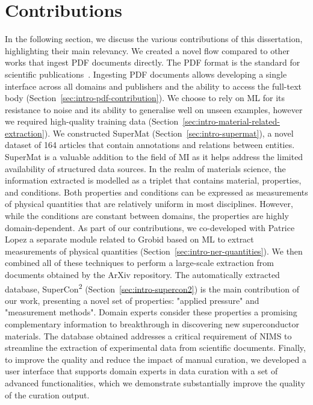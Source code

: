 \section{Contributions}
\label{sec-intro-contributions}
In the following section, we discuss the various contributions of this dissertation, highlighting their main relevancy. 
We created a novel flow compared to other works that ingest PDF documents directly. 
The PDF format is the standard for scientific publications~\cite{johnson2018pdfStatistics}. 
Ingesting PDF documents allows developing a single interface across all domains and publishers and the ability to access the full-text body (Section~\ref{sec:intro-pdf-contribution}). 
We choose to rely on ML for its resistance to noise and its ability to generalise well on unseen examples, however we required high-quality training data (Section~\ref{sec:intro-material-related-extraction}). 
We constructed SuperMat (Section~\ref{sec:intro-supermat}), a novel dataset of 164 articles that contain annotations and relations between entities. SuperMat is a valuable addition to the field of MI as it helps address the limited availability of structured data sources.
In the realm of materials science, the information extracted is modelled as a triplet that contains material, properties, and conditions. Both properties and conditions can be expressed as measurements of physical quantities that are relatively uniform in most disciplines. 
However, while the conditions are constant between domains, the properties are highly domain-dependent. As part of our contributions, we co-developed with Patrice Lopez a separate module related to Grobid based on ML to extract measurements of physical quantities (Section~\ref{sec:intro-ner-quantities}).
We then combined all of these techniques to perform a large-scale extraction from documents obtained by the ArXiv repository.
The automatically extracted database, SuperCon\textsuperscript{2} (Section~\ref{sec:intro-supercon2}) is the main contribution of our work, presenting a novel set of properties: "applied pressure" and "measurement methods".
Domain experts consider these properties a promising complementary information to breakthrough in discovering new superconductor materials.
The database obtained addresses a critical requirement of NIMS to streamline the extraction of experimental data from scientific documents.  
Finally, to improve the quality and reduce the impact of manual curation, we developed a user interface that supports domain experts in data curation with a set of advanced functionalities, which we demonstrate substantially improve the quality of the curation output. 

